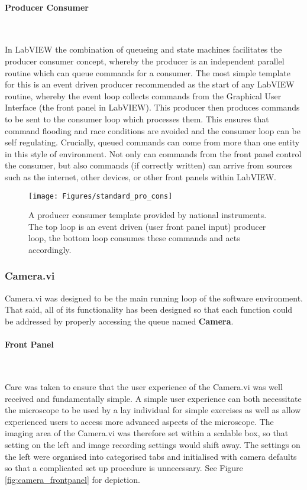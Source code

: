 \documentclass[10pt,a4paper]{report}
\begin{document}
\begin{spacing}{1.5}
\paragraph{Producer Consumer}~

In LabVIEW the combination of queueing and state machines facilitates the producer consumer concept, whereby the producer is an independent parallel routine which can queue commands for a consumer. The most simple template for this is an event driven producer recommended as the start of any LabVIEW routine, whereby the event loop collects commands from the Graphical User Interface (the front panel in LabVIEW). This producer then produces commands to be sent to the consumer loop which processes them. This ensures that command flooding and race conditions are avoided and the consumer loop can be self regulating. Crucially, queued commands can come from more than one entity in this style of environment. Not only can commands from the front panel control the consumer, but also commands (if correctly written) can arrive from sources such as the internet, other devices, or other front panels within LabVIEW.

\begin{figure}
\centering
\texttt{[image: Figures/standard\_pro\_cons]}
\caption[LabVIEW Producer Consumer Template]{A producer consumer template provided by national instruments. The top loop is an event driven (user front panel input) producer loop, the bottom loop consumes these commands and acts accordingly.}
\label{fig:standard_pro_cons}
\end{figure}


\subsubsection{Camera.vi}

Camera.vi was designed to be the main running loop of the software environment. That said, all of its functionality has been designed so that each function could be addressed by properly accessing the queue named \textbf{Camera}.

\paragraph{Front Panel}~

Care was taken to ensure that the user experience of the Camera.vi was well received and fundamentally simple. A simple user experience can both necessitate the microscope to be used by a lay individual for simple exercises as well as allow experienced users to access more advanced aspects of the microscope. The imaging area of the Camera.vi was therefore set within a scalable box, so that setting on the left and image recording settings would shift away. The settings on the left were organised into categorised tabs and initialised with camera defaults so that a complicated set up procedure is unnecessary. See Figure \ref{fig:camera_frontpanel} for depiction.


\end{spacing}
\end{document}
